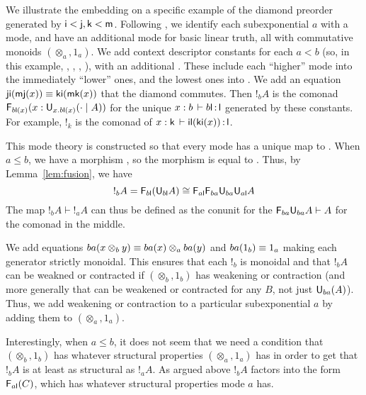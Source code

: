 We illustrate the embedding on a specific example of the diamond
preorder generated by $\mathsf{i} < \mathsf{j},\mathsf{k} < \mathsf{m}$.  Following
\citep[Example 4.3]{reed09adjoint}, we identify each subexponential $a$
with a mode, and have an additional mode  for basic linear truth,
all with commutative monoids $(\otimes_a,1_a)$.  We add context
descriptor constants  for each $a < b$ (so, in
this example, , , , ), with an
additional .  These include each
``higher'' mode into the immediately ``lower'' ones, and the lowest ones
into .  We add an equation $\mathsf{ji}(\mathsf{mj}(x)) \equiv
\mathsf{ki}(\mathsf{mk}(x))$ that the diamond commutes.  Then $!_b A$ is the
comonad $\mathsf{F}_{b{\mathsf{l}}(x)}(x : \mathsf{U}_{x.b\mathsf{l}(x)}(\cdot \mid A))$ for the
unique $x : b \, \vdash b{\mathsf{l}} \, \mathit{:} \, \mathsf{l}$ generated by these constants.
For example, $!_k$ is the comonad of $x :
  \mathsf{k} \, \vdash \mathsf{il}(\mathsf{ki}(x)) \, \mathit{:} \, \mathsf{l}$.

This mode theory is constructed so that every mode has a unique map to
.  When $a \le b$, we have a morphism , so
the morphism  is equal to
.  Thus, by Lemma~\ref{lem:fusion},
we have
\[
!_b A = \mathsf{F}_{{b\mathsf{l}}}(\mathsf{U}_{{b\mathsf{l}}} A) \cong \mathsf{F}_{{a\mathsf{l}}}\mathsf{F}_{{ba}} \mathsf{U}_{{ba}} \mathsf{U}_{{a\mathsf{l}}} A
\]
The map $!_b A \vdash !_a A$ can thus be defined as the conunit for the
$\mathsf{F}_{{ba}} \mathsf{U}_{{ba}} A \vdash A$ for the comonad in the middle.

We add equations $ba(x \otimes_b y) \equiv ba(x) \otimes_a ba(y)$ and
$ba(1_b) \equiv 1_a$ making each generator strictly monoidal.  This
ensures that each $!_b$ is monoidal and that $!_b A$ can be weakned or
contracted if $(\otimes_b,1_b)$ has weakening or contraction (and more
generally that  can be weakened or contracted for any $B$, not
just $\mathsf{U}_{ba}{(A)}$).  Thus, we add weakening or contraction to
a particular subexponential $a$ by adding them to $(\otimes_a,1_a)$.

Interestingly, when $a \le b$, it does not seem that we need a condition
that $(\otimes_b,1_b)$ has whatever structural properties
$(\otimes_a,1_a)$ has in order to get that $!_b A$ is at least as
structural as $!_a A$.  As argued above $!_b A$ factors into the form
$\mathsf{F}_{a{\mathsf{l}}}(C)$, which has whatever structural properties mode $a$ has.

